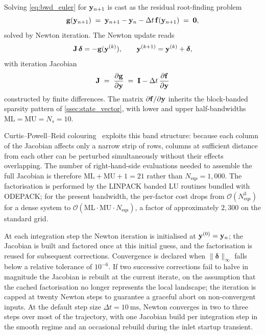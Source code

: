 Solving \cref{eq:bwd_euler} for \(\mathbf{y}_{n+1}\) is cast as the residual root-finding problem
\begin{equation}
  \mathbf{g}(\mathbf{y}_{n+1}) \;=\; \mathbf{y}_{n+1} - \mathbf{y}_n - \Delta t\,\mathbf{f}(\mathbf{y}_{n+1}) \;=\; \mathbf{0},
  \label{eq:newton_residual}
\end{equation}
solved by Newton iteration. The Newton update reads
\begin{equation*}
  \mathbf{J}\,\bm{\delta} = -\mathbf{g}(\mathbf{y}^{(k)}), \qquad \mathbf{y}^{(k+1)} = \mathbf{y}^{(k)} + \bm{\delta},
\end{equation*}
with iteration Jacobian
\begin{equation*}
  \mathbf{J} \;=\; \frac{\partial \mathbf{g}}{\partial \mathbf{y}} \;=\; \mathbf{I} - \Delta t\,\frac{\partial \mathbf{f}}{\partial \mathbf{y}}
\end{equation*}
constructed by finite differences. The matrix \(\partial\mathbf{f}/\partial\mathbf{y}\) inherits the block-banded sparsity pattern of \cref{ssec:state_vector}, with lower and upper half-bandwidths \(\mathrm{ML} = \mathrm{MU} = N_s = 10\).

Curtis--Powell--Reid colouring~\cite{Curtis1974} exploits this band structure: because each column of the Jacobian affects only a narrow strip of rows, columns at sufficient distance from each other can be perturbed simultaneously without their effects overlapping. The number of right-hand-side evaluations needed to assemble the full Jacobian is therefore \(\mathrm{ML} + \mathrm{MU} + 1 = 21\) rather than \(N_{\mathrm{eqs}} = 1{,}000\). The factorisation is performed by the LINPACK banded LU routines bundled with ODEPACK; for the present bandwidth, the per-factor cost drops from \(\mathcal{O}(N_{\mathrm{eqs}}^{3})\) for a dense system to \(\mathcal{O}(\mathrm{ML}\cdot\mathrm{MU}\cdot N_{\mathrm{eqs}})\), a factor of approximately \(2{,}300\) on the standard grid.

At each integration step the Newton iteration is initialised at \(\mathbf{y}^{(0)} = \mathbf{y}_n\); the Jacobian is built and factored once at this initial guess, and the factorisation is reused for subsequent corrections. Convergence is declared when \(\lVert\bm{\delta}\rVert_\infty\) falls below a relative tolerance of \(10^{-6}\). If two successive corrections fail to halve in magnitude the Jacobian is rebuilt at the current iterate, on the assumption that the cached factorisation no longer represents the local landscape; the iteration is capped at twenty Newton steps to guarantee a graceful abort on non-convergent inputs. At the default step size \(\Delta t = \SI{10}{\milli\second}\), Newton converges in two to three steps over most of the trajectory, with one Jacobian build per integration step in the smooth regime and an occasional rebuild during the inlet startup transient.

